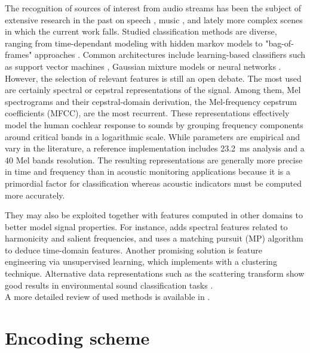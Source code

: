 \documentclass[sensors,article,submit,moreauthors,pdftex,10pt,a4paper]{mdpi}
\begin{document}
The recognition of sources of interest from audio streams has been the subject of extensive research in the past on speech \cite{anusuya2009}, music \cite{tzanetakis2002}, and lately more complex scenes in which the current work falls. Studied classification methods are diverse, ranging from time-dependant modeling with hidden markov models \cite{ntalampiras2014} to "bag-of-frames" approaches \cite{aucouturier2007, foggia2015}. Common architectures include learning-based classifiers such as support vector machines \cite{kumar2016}, Gaussian mixture models \cite{radhakrishnan2005} or neural networks \cite{salamon2017, piczak2015}. However, the selection of relevant features is still an open debate. The most used are certainly spectral \cite{khunarsal2013} or cepstral \cite{couvreur2004} representations of the signal. Among them, Mel spectrograms and their cepstral-domain derivation, the Mel-frequency cepstrum coefficients (MFCC), are the most recurrent. These representations effectively model the human cochlear response to sounds by grouping frequency components around critical bands in a logarithmic scale. While parameters are empirical and vary in the literature, a reference implementation includes 23.2~ms analysis and a 40 Mel bands resolution. The resulting representations are generally more precise in time and frequency than in acoustic monitoring applications because it is a primordial factor for classification whereas acoustic indicators must be computed more accurately.

They may also be exploited together with features computed in other domains to better model signal properties. For instance, \cite{cai2006} adds spectral features related to harmonicity and salient frequencies, and \cite{chu2009} uses a matching pursuit (MP) algorithm to deduce time-domain features. Another promising solution is feature engineering via unsupervised learning, which \cite{salamon2015-2} implements with a clustering technique. Alternative data representations such as the scattering transform \cite{bauge2013} show good results in environmental sound classification tasks \cite{salamon2015}.\\
A more detailed review of used methods is available in \cite{chachada2013}.

\section{Encoding scheme} \label{sec:coder}
\end{document}
